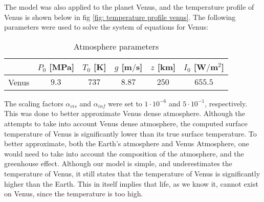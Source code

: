 \documentclass[a4paper]{article}
\newcommand{\newparagraph}{\vspace{.5cm}\noindent}
\begin{document}
\newparagraph
The model was also applied to the planet Venus, and the temperature profile of Venus is shown below in fig \ref{fig: temperature profile venus}.
The following parameters were used to solve the system of equations for Venus\cite{enwiki:1216079584}:
\begin{table}[H]
    \centering 
    \caption{Atmosphere parameters}
    \begin{tabular}{|c|c|c|c|c|c|}\hline
        & $P_0$ [MPa] & $T_0$ [K] & $g$ [m$/$s]& $z$ [km] & $I_0$ [W$/$m$^2$] \\\hline
        Venus & $9.3$ & $737$ & $8.87$ & $250$ & $655.5$ \\\hline
    \end{tabular}
\end{table}\noindent
The scaling factors $\alpha_{vis}$ and $\alpha_{inf}$ were set to $1\cdot10^{-6}$ and $5\cdot10^{-1}$, respectively.
This was done to better approximate Venus dense atmosphere.
Although the attempts to take into account Venus dense atmosphere, the computed surface temperature of Venus is significantly lower than its true surface temperature.
To better approximate, both the Earth's atmosphere and Venus Atmosphere, one would need to take into account the composition of the atmosphere, and the greenhouse effect.
Although our model is simple, and underestimates the temperature of Venus, it still states that the temperature of Venus is significantly higher than the Earth.
This in itself implies that life, as we know it, cannot exist on Venus, since the temperature is too high.
\end{document}
